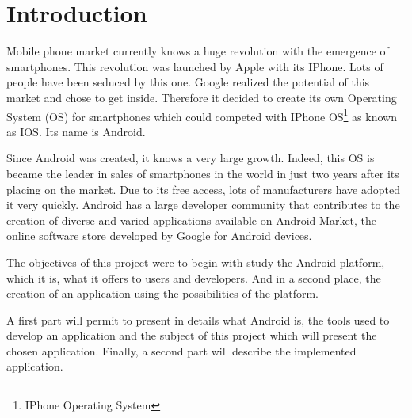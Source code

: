 \chapter{Introduction}

Mobile phone market currently knows a huge revolution with the emergence of smartphones.
This revolution was launched by Apple with its IPhone. Lots of people have been seduced by this one.
Google realized the potential of this market and chose to get inside.
Therefore it decided to create its own Operating System (OS) for smartphones which could competed with IPhone OS\protect\footnote{IPhone Operating System} as known as IOS.
Its name is Android.

\noindent Since Android was created, it knows a very large growth.
Indeed, this OS is became the leader in sales of smartphones in the world in just two years after its placing on the market.
Due to its free access, lots of manufacturers have adopted it very quickly.
Android has a large developer community that contributes to the creation of diverse and varied applications available on Android Market, the online software store developed by Google for Android devices.

\noindent The objectives of this project were to begin with study the Android platform, which it is, what it offers to users and developers.
And in a second place, the creation of an application using the possibilities of the platform.

\noindent A first part will permit to present in details what Android is, the tools used to develop an application and the subject of this project which will present the chosen application.
Finally, a second part will describe the implemented application.

\clearpage
